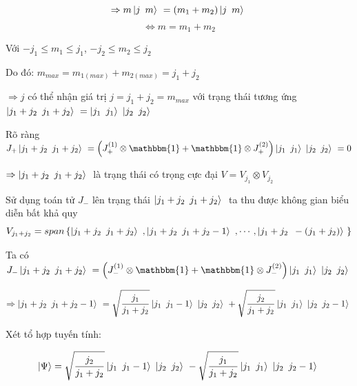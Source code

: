 \documentclass{report}
\begin{document}
	\[ \Rightarrow m \left| {j \enskip m} \right\rangle\ = (m_{1}+m_{2}) \left| {j \enskip m} \right\rangle\ \]
	\[ \Leftrightarrow m = m_{1} + m_{2} \]
	
Với \( -j_{1} \leq m_{1} \leq j_{1} \), \(-j_{2} \leq m_{2} \leq j_{2} \)
	
Do đó: \( m_{max} = m_{1(max)} + m_{2(max)} = j_{1} + j_{2} \)

\(\Rightarrow j \) có thể nhận giá trị \( j = j_{1} + j_{2} = m_{max} \) với trạng thái tương ứng \( \left| j_{1} + j_{2} \enskip j_{1} + j_{2} \right\rangle\ = \left| j_{1} \enskip j_{1} \right\rangle\ \left| j_{2} \enskip j_{2} \right\rangle\ \)

Rõ ràng \( J_{+} \left| j_{1} + j_{2} \enskip j_{1} + j_{2} \right\rangle\ = \left( J_{+}^{(1)} \otimes \mathbbm{1} +  \mathbbm{1} \otimes J_{+}^{(2)} \right) \left| j_{1} \enskip j_{1} \right\rangle\ \left| j_{2} \enskip j_{2} \right\rangle\ = 0 \)

\( \Rightarrow \left| j_{1} + j_{2} \enskip j_{1} + j_{2} \right\rangle\ \) là trạng thái có trọng cực đại \( V = V_{j_{1}} \otimes V_{j_{2}} \)

Sử dụng toán tử \( J_{-} \) lên trạng thái \( \left| j_{1} + j_{2} \enskip j_{1} + j_{2} \right\rangle\ \) ta thu được không gian biểu diễn bất khả quy
\[ V_{j_{1}+j_{2}} = span \left\lbrace \left| j_{1} + j_{2} \enskip j_{1} + j_{2} \right\rangle\ , \left| j_{1} + j_{2} \enskip j_{1} + j_{2} - 1 \right\rangle\ , \cdots , \left| j_{1} + j_{2} \enskip - \left( j_{1} + j_{2} \right) \right\rangle\ \right\rbrace \]

Ta có \( J_{-} \left| j_{1} + j_{2} \enskip j_{1} + j_{2} \right\rangle\ = \left( J_{-}^{(1)} \otimes \mathbbm{1} +  \mathbbm{1} \otimes J_{-}^{(2)} \right) \left| j_{1} \enskip j_{1} \right\rangle\ \left| j_{2} \enskip j_{2} \right\rangle\ \)

\[ \Rightarrow \left| j_{1} + j_{2} \enskip j_{1} + j_{2} - 1 \right\rangle\ = \sqrt{\frac{j_{1}}{j_{1} + j_{2}}} \left| j_{1} \enskip j_{1} - 1 \right\rangle\ \left| j_{2} \enskip j_{2} \right\rangle\ + \sqrt{\frac{j_{2}}{j_{1} + j_{2}}} \left| j_{1} \enskip j_{1} \right\rangle\ \left| j_{2} \enskip j_{2} - 1 \right\rangle\ \]

Xét tổ hợp tuyến tính:

\[ \left| \Psi \right\rangle = \sqrt{\frac{j_{2}}{j_{1} + j_{2}}} \left| j_{1} \enskip j_{1} - 1 \right\rangle\ \left| j_{2} \enskip j_{2} \right\rangle\ - \sqrt{\frac{j_{1}}{j_{1} + j_{2}}} \left| j_{1} \enskip j_{1} \right\rangle\ \left| j_{2} \enskip j_{2} - 1 \right\rangle\ \]
\end{document}
